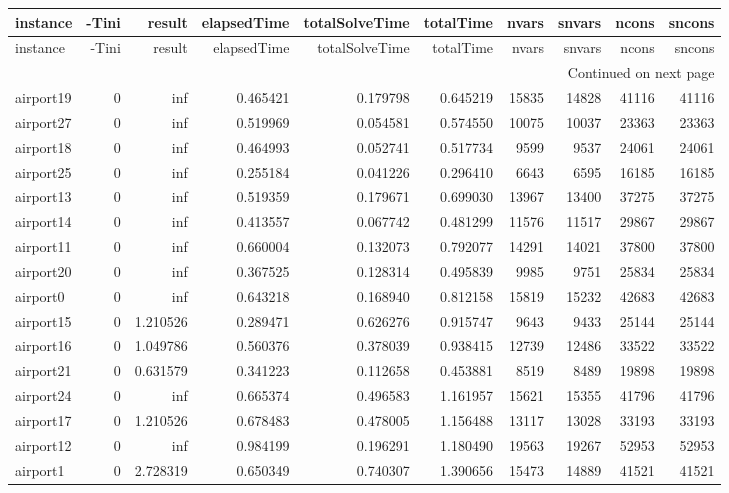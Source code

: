 \begin{longtable}{|l|r|r|r|r|r|r|r|r|r|}
\toprule
instance & -Tini & result & elapsedTime & totalSolveTime & totalTime & nvars & snvars & ncons & sncons \\
\midrule
\endfirsthead
\toprule
instance & -Tini & result & elapsedTime & totalSolveTime & totalTime & nvars & snvars & ncons & sncons \\
\midrule
\endhead
\midrule
\multicolumn{10}{r}{Continued on next page} \\
\midrule
\endfoot
\bottomrule
\endlastfoot
airport19 & 0 & inf & 0.465421 & 0.179798 & 0.645219 & 15835 & 14828 & 41116 & 41116 \\
airport27 & 0 & inf & 0.519969 & 0.054581 & 0.574550 & 10075 & 10037 & 23363 & 23363 \\
airport18 & 0 & inf & 0.464993 & 0.052741 & 0.517734 & 9599 & 9537 & 24061 & 24061 \\
airport25 & 0 & inf & 0.255184 & 0.041226 & 0.296410 & 6643 & 6595 & 16185 & 16185 \\
airport13 & 0 & inf & 0.519359 & 0.179671 & 0.699030 & 13967 & 13400 & 37275 & 37275 \\
airport14 & 0 & inf & 0.413557 & 0.067742 & 0.481299 & 11576 & 11517 & 29867 & 29867 \\
airport11 & 0 & inf & 0.660004 & 0.132073 & 0.792077 & 14291 & 14021 & 37800 & 37800 \\
airport20 & 0 & inf & 0.367525 & 0.128314 & 0.495839 & 9985 & 9751 & 25834 & 25834 \\
airport0 & 0 & inf & 0.643218 & 0.168940 & 0.812158 & 15819 & 15232 & 42683 & 42683 \\
airport15 & 0 & 1.210526 & 0.289471 & 0.626276 & 0.915747 & 9643 & 9433 & 25144 & 25144 \\
airport16 & 0 & 1.049786 & 0.560376 & 0.378039 & 0.938415 & 12739 & 12486 & 33522 & 33522 \\
airport21 & 0 & 0.631579 & 0.341223 & 0.112658 & 0.453881 & 8519 & 8489 & 19898 & 19898 \\
airport24 & 0 & inf & 0.665374 & 0.496583 & 1.161957 & 15621 & 15355 & 41796 & 41796 \\
airport17 & 0 & 1.210526 & 0.678483 & 0.478005 & 1.156488 & 13117 & 13028 & 33193 & 33193 \\
airport12 & 0 & inf & 0.984199 & 0.196291 & 1.180490 & 19563 & 19267 & 52953 & 52953 \\
airport1 & 0 & 2.728319 & 0.650349 & 0.740307 & 1.390656 & 15473 & 14889 & 41521 & 41521 \\

\end{longtable}
